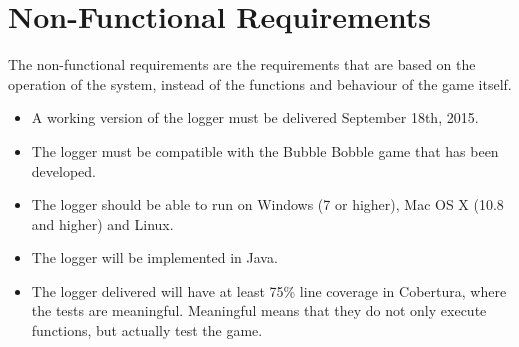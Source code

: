 \chapter{Non-Functional Requirements}

The non-functional requirements are the requirements that are based on the operation of the system, instead of the functions and behaviour of the game itself.

\begin{itemize}
\itemsep0em
	\item A working version of the logger must be delivered September 18th, 2015.
	\item The logger must be compatible with the Bubble Bobble game that has been developed. 
	\item The logger should be able to run on Windows (7 or higher), Mac OS X (10.8 and higher) and Linux.
	\item The logger will be implemented in Java. 
	\item The logger delivered will have at least 75\% line coverage in Cobertura, where the tests are meaningful. Meaningful means that they do not only execute functions, but actually test the game. 
\end{itemize}
